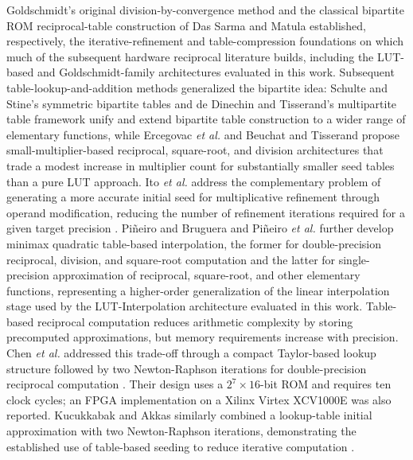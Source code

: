 \documentclass[manuscript,screen,review]{acmart}
\begin{document}
Goldschmidt's original division-by-convergence method \cite{Goldschmidt64} and the classical bipartite ROM reciprocal-table construction of Das Sarma and Matula \cite{DasSarmaMatula95} established, respectively, the iterative-refinement and table-compression foundations on which much of the subsequent hardware reciprocal literature builds, including the LUT-based and Goldschmidt-family architectures evaluated in this work. Subsequent table-lookup-and-addition methods generalized the bipartite idea: Schulte and Stine's symmetric bipartite tables \cite{SchulteStine99} and de Dinechin and Tisserand's multipartite table framework \cite{DeDinechinTisserand05} unify and extend bipartite table construction to a wider range of elementary functions, while Ercegovac \textit{et al.} \cite{ErcegovacLangMullerTisserand00} and Beuchat and Tisserand \cite{BeuchatTisserand02} propose small-multiplier-based reciprocal, square-root, and division architectures that trade a modest increase in multiplier count for substantially smaller seed tables than a pure LUT approach. Ito \textit{et al.} address the complementary problem of generating a more accurate initial seed for multiplicative refinement through operand modification, reducing the number of refinement iterations required for a given target precision \cite{Ito97}. Pi\~{n}eiro and Bruguera \cite{PineiroBruguera02} and Pi\~{n}eiro \textit{et al.} \cite{PineiroObermanMullerBruguera05} further develop minimax quadratic table-based interpolation, the former for double-precision reciprocal, division, and square-root computation and the latter for single-precision approximation of reciprocal, square-root, and other elementary functions, representing a higher-order generalization of the linear interpolation stage used by the LUT-Interpolation architecture evaluated in this work. Table-based reciprocal computation reduces arithmetic complexity by storing precomputed approximations, but memory requirements increase with precision. Chen \textit{et al.} addressed this trade-off through a compact Taylor-based lookup structure followed by two Newton-Raphson iterations for double-precision reciprocal computation \cite{Chen05}. Their design uses a $2^{7} \times 16$-bit ROM and requires ten clock cycles; an FPGA implementation on a Xilinx Virtex XCV1000E was also reported. Kucukkabak and Akkas similarly combined a lookup-table initial approximation with two Newton-Raphson iterations, demonstrating the established use of table-based seeding to reduce iterative computation \cite{Kucukkabak04}.
\end{document}
